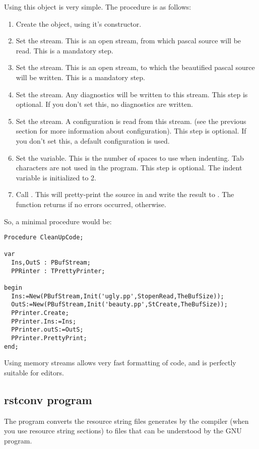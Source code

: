 \documentclass{report}
\begin{document}
Using this object is very simple. The procedure is as follows:
\begin{enumerate}
\item Create the object, using it's constructor.
\item Set the  stream. This is an open stream, from which pascal source will be
read. This is a mandatory step.
\item Set the  stream. This is an open stream, to which the
beautified pascal source will be written. This is a mandatory step.
\item Set the  stream. Any diagnostics will be written to this
stream. This step is optional. If you don't set this, no diagnostics are
written.
\item Set the  stream. A configuration is read from this stream.
(see the previous section for more information about configuration). This
step is optional. If you don't set this, a default configuration is used.
\item Set the  variable. This is the number of spaces to use
when indenting. Tab characters are not used in the program. This step is
optional. The indent variable is initialized to 2.
\item Call . This will pretty-print the source in 
and write the result to . The function returns  if no
errors occurred,  otherwise.
\end{enumerate}

So, a minimal procedure would be:
\begin{verbatim}
Procedure CleanUpCode;

var
  Ins,OutS : PBufStream;
  PPRinter : TPrettyPrinter;

begin
  Ins:=New(PBufStream,Init('ugly.pp',StopenRead,TheBufSize));
  OutS:=New(PBufStream,Init('beauty.pp',StCreate,TheBufSize));
  PPrinter.Create;
  PPrinter.Ins:=Ins;
  PPrinter.outS:=OutS;
  PPrinter.PrettyPrint;
end;
\end{verbatim}

Using memory streams allows very fast formatting of code, and is perfectly
suitable for editors.

\subsection{rstconv program}

The  program converts the resource string files generates by
the compiler (when you use resource string sections) to  files
that can be understood by the GNU  program.
\end{document}
